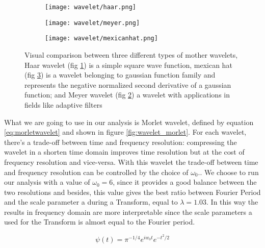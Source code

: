 \documentclass[11pt]{report}
\begin{document}
\begin{figure}
\begin{subfigure}{0.3\textwidth}
\texttt{[image: wavelet/haar.png]}
\caption{}
\label{fig:wavelet_haar}
\end{subfigure}
\begin{subfigure}{0.3\textwidth}
\texttt{[image: wavelet/meyer.png]}
\caption{}
\label{fig:wavelet_meyer}
\end{subfigure}
\begin{subfigure}{0.3\textwidth}
\texttt{[image: wavelet/mexicanhat.png]}
\caption{}
\label{fig:wavelet_mexicanhat}
\end{subfigure}
\caption{Visual comparison between three different types of mother wavelets, Haar wavelet (fig \ref{fig:wavelet_haar}) is a simple square wave function, mexican hat (fig \ref{fig:wavelet_mexicanhat}) is a wavelet belonging to gaussian function family and represents the negative normalized second derivative of a gaussian function; and Meyer wavelet (fig \ref{fig:wavelet_meyer}) a wavelet with applications in fields like adaptive filters}
\label{fig:different_wavelets}
\end{figure}



What we are going to use in our analysis is Morlet wavelet, defined by equation \ref{eq:morletwavelet} and shown in figure \ref{fig:wavelet_morlet}.
For each wavelet, there's a trade-off between time and frequency resolution: compressing the wavelet in a shorten time domain improves time resolution but at the cost of frequency resolution and vice-versa.
With this wavelet the trade-off between time and frequency resolution can be controlled by the choice of $\omega_0$.\cite{muller-2004}.
We choose to run our analysis with a value of $\omega_0 = 6$, since it provides a good balance between the two resolutions \cite{grinsted-2004} and besides, this value gives the best ratio between Fourier Period and the scale parameter a during a Transform, equal to $\lambda = 1.03$.
In this way the results in frequency domain are more interpretable since the scale parameters a used for the Transform is almost equal to the Fourier period.


\begin{equation}\label{eq:morletwavelet}
\psi\left(t\right) = \pi^{-1/4}e^{iw_0 t}e^{-t^2/2}
\end{equation}
\end{document}
